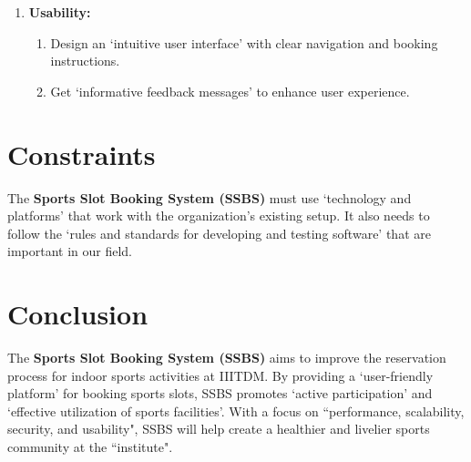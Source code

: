 \documentclass[12pt]{article}
\begin{document}
\begin{enumerate}[label=\arabic*.]
    \vspace{0.4cm}

    \item \textbf{Usability:}
    \begin{enumerate}[label=\alph*)]
        \item Design an `intuitive user interface' with clear navigation and booking instructions.
        \item Get `informative feedback messages' to enhance user experience.
    \end{enumerate}
   
\end{enumerate}

\newpage

\section*{Constraints}
\hspace{0.8cm} The \textbf{Sports Slot Booking System (SSBS)} must use `technology and platforms' that work with the organization's existing setup. It also needs to follow the `rules and standards for developing and testing software' that are important in our field.

\vspace{0.4cm}

\section*{Conclusion}
\hspace{0.8cm} The \textbf{Sports Slot Booking System (SSBS)} aims to improve the reservation process for indoor sports activities at IIITDM. By providing a `user-friendly platform' for booking sports slots, SSBS promotes `active participation' and `effective utilization of sports facilities'. With a focus on ``performance, scalability, security, and usability", SSBS will help create a healthier and livelier sports community at the ``institute".
\end{document}
